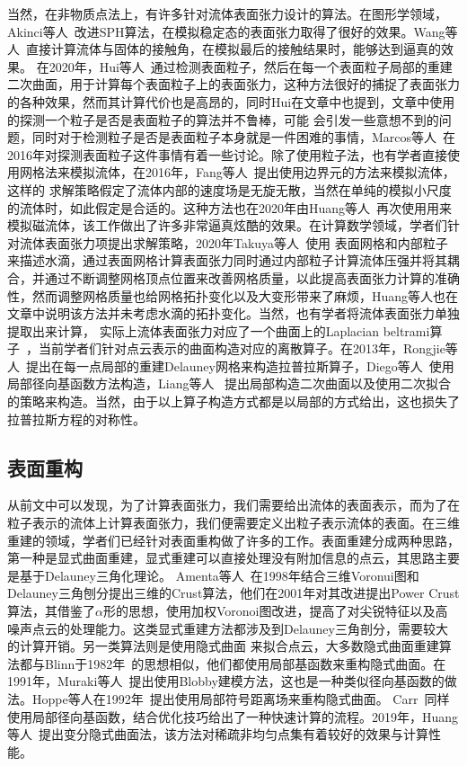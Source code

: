 当然，在非物质点法上，有许多针对流体表面张力设计的算法。在图形学领域，Akinci等人~\cite{akinci2013versatile}改进SPH算法，在模拟稳定态的表面张力取得了很好的效果。Wang等人~\cite{wang2005water}直接计算流体与固体的接触角，在模拟最后的接触结果时，能够达到逼真的效果。
在2020年，Hui等人~\cite{wang2020codimensional}通过检测表面粒子，然后在每一个表面粒子局部的重建二次曲面，用于计算每个表面粒子上的表面张力，这种方法很好的捕捉了表面张力的各种效果，然而其计算代价也是高昂的，同时Hui在文章中也提到，文章中使用的探测一个粒子是否是表面粒子的算法并不鲁棒，可能
会引发一些意想不到的问题，同时对于检测粒子是否是表面粒子本身就是一件困难的事情，Marcos等人~\cite{sandim2016boundary}在2016年对探测表面粒子这件事情有着一些讨论。除了使用粒子法，也有学者直接使用网格法来模拟流体，在2016年，Fang等人~\cite{da2016surface}提出使用边界元的方法来模拟流体，这样的
求解策略假定了流体内部的速度场是无旋无散，当然在单纯的模拟小尺度的流体时，如此假定是合适的。这种方法也在2020年由Huang等人~\cite{huang2020surface}再次使用用来模拟磁流体，该工作做出了许多非常逼真炫酷的效果。在计算数学领域，学者们针对流体表面张力项提出求解策略，2020年Takuya等人~\cite{matsunaga2020moving}使用
表面网格和内部粒子来描述水滴，通过表面网格计算表面张力同时通过内部粒子计算流体压强并将其耦合，并通过不断调整网格顶点位置来改善网格质量，以此提高表面张力计算的准确性，然而调整网格质量也给网格拓扑变化以及大变形带来了麻烦，Huang等人也在文章中说明该方法并未考虑水滴的拓扑变化。当然，也有学者将流体表面张力单独提取出来计算，
实际上流体表面张力对应了一个曲面上的Laplacian beltrami算子~\cite{needham2021visual}，当前学者们针对点云表示的曲面构造对应的离散算子。在2013年，Rongjie等人~\cite{lai2013local}提出在每一点局部的重建Delauney网格来构造拉普拉斯算子，Diego等人~\cite{alvarez2021local}使用局部径向基函数方法构造，Liang等人~\cite{liang2013solving}
提出局部构造二次曲面以及使用二次拟合的策略来构造。当然，由于以上算子构造方式都是以局部的方式给出，这也损失了拉普拉斯方程的对称性。
\subsection{表面重构} 
从前文中可以发现，为了计算表面张力，我们需要给出流体的表面表示，而为了在粒子表示的流体上计算表面张力，我们便需要定义出粒子表示流体的表面。在三维重建的领域，学者们已经针对表面重构做了许多的工作。表面重建分成两种思路，第一种是显式曲面重建，显式重建可以直接处理没有附加信息的点云，其思路主要是基于Delauney三角化理论。
Amenta等人~\cite{amenta1998new}在1998年结合三维Voronui图和Delauney三角刨分提出三维的Crust算法，他们在2001年对其改进提出Power Crust算法，其借鉴了$\alpha$形的思想，使用加权Voronoi图改进，提高了对尖锐特征以及高噪声点云的处理能力。这类显式重建方法都涉及到Delauney三角剖分，需要较大的计算开销。另一类算法则是使用隐式曲面
来拟合点云，大多数隐式曲面重建算法都与Blinn于1982年~\cite{blinn1982generalization}的思想相似，他们都使用局部基函数来重构隐式曲面。在1991年，Muraki等人~\cite{muraki1991volumetric}提出使用Blobby建模方法，这也是一种类似径向基函数的做法。Hoppe等人在1992年~\cite{hoppe1992surface}提出使用局部符号距离场来重构隐式曲面。
Carr~\cite{carr2001reconstruction}同样使用局部径向基函数，结合优化技巧给出了一种快速计算的流程。2019年，Huang等人~\cite{huang2019variational}提出变分隐式曲面法，该方法对稀疏非均匀点集有着较好的效果与计算性能。

